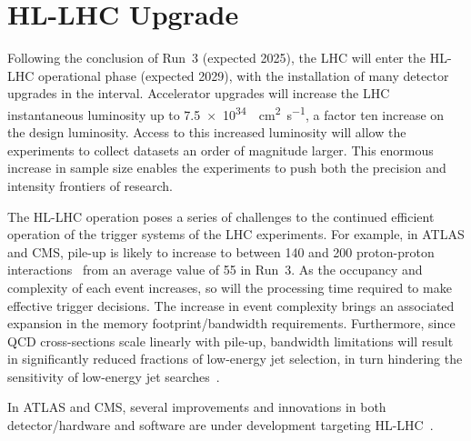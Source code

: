 \section{HL-LHC Upgrade}



Following the conclusion of Run~3 (expected 2025), the LHC will enter the HL-LHC operational phase (expected 2029), with the installation of many detector upgrades in the interval. Accelerator upgrades will increase the LHC instantaneous luminosity up to \SI{7.5e34}{\per\square\cm\per\second}, a factor ten increase on the design luminosity. Access to this increased luminosity will allow the experiments to collect datasets an order of magnitude larger. This enormous increase in sample size enables the experiments to push both the precision and intensity frontiers of research.

The HL-LHC operation poses a series of challenges to the continued efficient operation of the trigger systems of the LHC experiments. For example, in ATLAS and CMS, pile-up is likely to increase to between 140 and 200 proton-proton interactions~\cite{ATLAS:pileup} from an average value of 55 in Run~3. As the occupancy and complexity of each event increases, so will the processing time required to make effective trigger decisions. %
The increase in event complexity brings an associated expansion in the memory footprint/bandwidth requirements. 
Furthermore, since QCD cross-sections scale linearly with pile-up, bandwidth limitations will result in significantly reduced fractions of low-energy jet selection, in turn hindering the sensitivity of low-energy jet searches~\cite{albrecht2018hep}.

In ATLAS and CMS, several improvements and innovations in both detector/hardware and software are under development targeting HL-LHC~\cite{hl-lhc}.


